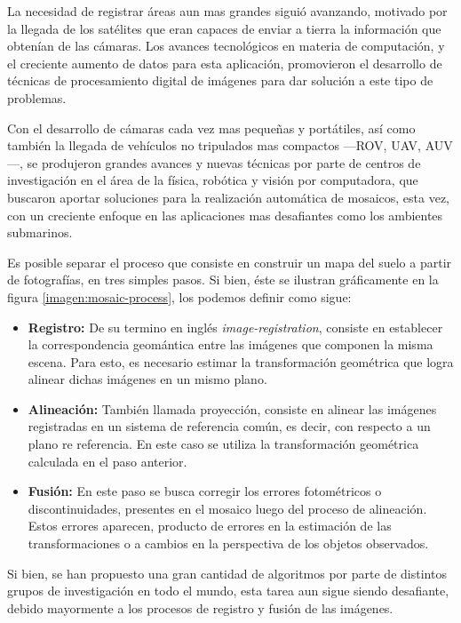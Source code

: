 La necesidad de registrar áreas aun mas grandes siguió avanzando, motivado por la llegada de los satélites que eran capaces de enviar a tierra la información que obtenían de las cámaras. Los avances tecnológicos en materia de computación, y el creciente aumento de datos para esta aplicación, promovieron el desarrollo de técnicas de procesamiento digital de imágenes para dar solución a este tipo de problemas.

Con el desarrollo de cámaras cada vez mas pequeñas y portátiles, así como también la llegada de vehículos no tripulados mas compactos ---ROV, UAV, AUV---, se produjeron grandes avances y nuevas técnicas por parte de centros de investigación en el área de la física, robótica y visión por computadora, que buscaron aportar soluciones para la realización automática de mosaicos, esta vez, con un creciente enfoque en las aplicaciones mas desafiantes como los ambientes submarinos.

Es posible separar el proceso que consiste en construir un mapa del suelo a partir de fotografías, en tres simples pasos. Si bien, éste se ilustran gráficamente en la figura \ref{imagen:mosaic-process}, los podemos definir como sigue:

\begin{itemize}
	\item \textbf{Registro:} De su termino en inglés \textit{image-registration}, consiste en establecer la correspondencia geomántica entre las imágenes que componen la misma escena. Para esto, es necesario estimar la transformación geométrica que logra alinear dichas imágenes en un mismo plano.
	
	\item \textbf{Alineación:} También llamada proyección, consiste en alinear las imágenes registradas en un sistema de referencia común, es decir, con respecto a un plano re referencia. En este caso se utiliza la transformación geométrica calculada en el paso anterior.
	
	\item \textbf{Fusión:} En este paso se busca corregir los errores fotométricos o discontinuidades, presentes en el mosaico luego del proceso de alineación. Estos errores aparecen, producto de errores en la estimación de las transformaciones o a cambios en la perspectiva de los objetos observados.
\end{itemize}

Si bien, se han propuesto una gran cantidad de algoritmos por parte de distintos grupos de investigación en todo el mundo, esta tarea aun sigue siendo desafiante, debido mayormente a los procesos de registro y fusión de las imágenes.

